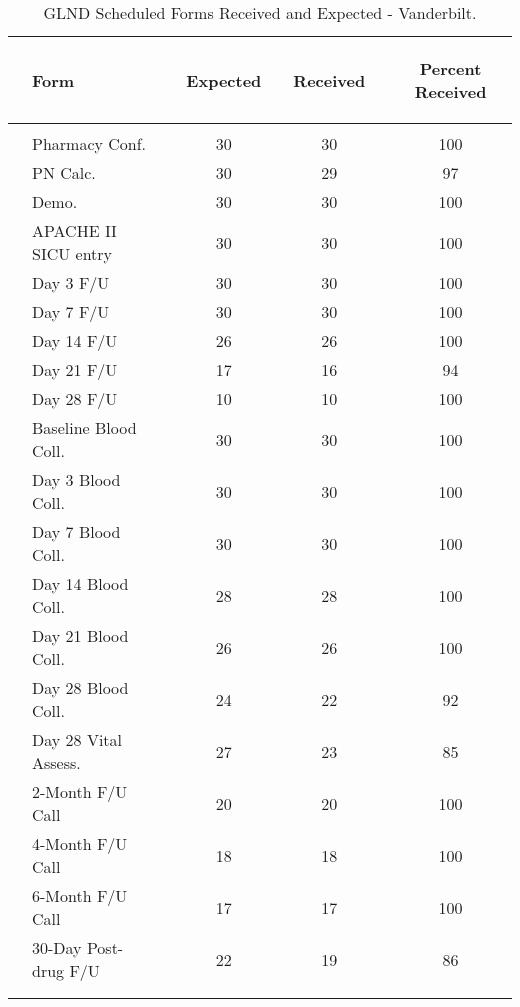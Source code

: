 \documentclass[dvips,10pt]{article}
\begin{document}
\clearpage
\begin{table}[t]
\caption
{ GLND Scheduled Forms Received and Expected - Vanderbilt. }
\begin{center}
\begin{tabular}{ @{}l@{}
@{}l@{}@{}p{1.5em}@{}@{}c@{}@{}p{1.5em}@{}@{}c@{}@{}p{1.5em}@{}@{}c@{}
}
\hline

& \parbox{6em}{\begin{center}Form\end{center}} && \parbox{6em}{\begin{center}Expected\end{center}} && \parbox{6em}{\begin{center}Received\end{center}} && \parbox{6em}{\begin{center}Percent Received\end{center}} \\

\hline

\\
& Pharmacy Conf. && 30 && 30 && 100 \\
& PN Calc. && 30 && 29 && 97 \\
& Demo. && 30 && 30 && 100 \\
& APACHE II SICU entry && 30 && 30 && 100 \\
& Day 3 F/U && 30 && 30 && 100 \\
& Day 7 F/U && 30 && 30 && 100 \\
& Day 14 F/U && 26 && 26 && 100 \\
& Day 21 F/U && 17 && 16 && 94 \\
& Day 28 F/U && 10 && 10 && 100 \\
& Baseline Blood Coll. && 30 && 30 && 100 \\
& Day 3 Blood Coll. && 30 && 30 && 100 \\
& Day 7 Blood Coll. && 30 && 30 && 100 \\
& Day 14 Blood Coll. && 28 && 28 && 100 \\
& Day 21 Blood Coll. && 26 && 26 && 100 \\
& Day 28 Blood Coll. && 24 && 22 && 92 \\
& Day 28 Vital Assess. && 27 && 23 && 85 \\
& 2-Month F/U Call && 20 && 20 && 100 \\
& 4-Month F/U Call && 18 && 18 && 100 \\
& 6-Month F/U Call && 17 && 17 && 100 \\
& 30-Day Post-drug F/U && 22 && 19 && 86 \\
\\
\hline \\

\end{tabular}

\end{center}
 \end{table}
\end{document}
